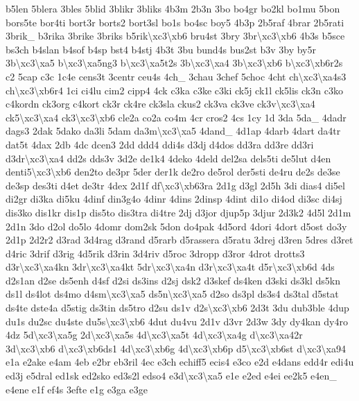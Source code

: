 \begin{DoxyCompactItemize}
b5len 5blera 3bles 5blid 3blikr 3bliks 4b3m 2b3n 3bo bo4gr bo2kl bo1mu 5bon bors5te bor4ti bort3r borts2 bort3sl bo1s bo4sc boy5 4b3p 2b5raf 4brar 2b5rati 3brik\-\_\- b3rika 3brike 3briks b5rik\textbackslash{}xc3\textbackslash{}xb6 bru4st 3bry 3br\textbackslash{}xc3\textbackslash{}xb6 4b3s b5sce bs3ch b4slan b4sof b4sp bst4 b4stj 4b3t 3bu bund4s bus2st b3v 3by by5r 3b\textbackslash{}xc3\textbackslash{}xa5 b\textbackslash{}xc3\textbackslash{}xa5ng3 b\textbackslash{}xc3\textbackslash{}xa5t2s 3b\textbackslash{}xc3\textbackslash{}xa4 3b\textbackslash{}xc3\textbackslash{}xb6 b\textbackslash{}xc3\textbackslash{}xb6r2s c2 5cap c3c 1c4e cens3t 3centr ceu4s 4ch\-\_\- 3chau 3chef 5choc 4cht ch\textbackslash{}xc3\textbackslash{}xa4s3 ch\textbackslash{}xc3\textbackslash{}xb6r4 1ci ci4lu cim2 cipp4 4ck c3ka c3ke c3ki ck5j ck1l ck5lis ck3n c3ko c4kordn ck3org c4kort ck3r ck4re ck3sla ckus2 ck3va ck3ve ck3v\textbackslash{}xc3\textbackslash{}xa4 ck5\textbackslash{}xc3\textbackslash{}xa4 ck3\textbackslash{}xc3\textbackslash{}xb6 cle2a co2a co4m 4cr cros2 4cs 1cy 1d 3da 5da\-\_\- 4dadr dags3 2dak 5dako da3li 5dam da3m\textbackslash{}xc3\textbackslash{}xa5 4dand\-\_\- 4d1ap 4darb 4dart da4tr dat5t 4dax 2db 4dc dcen3 2dd ddd4 ddi4s d3dj d4dos dd3ra dd3re dd3ri d3dr\textbackslash{}xc3\textbackslash{}xa4 dd2s dds3v 3d2e de1k4 4deko 4deld del2sa dels5ti de5lut d4en denti5\textbackslash{}xc3\textbackslash{}xb6 den2to de3pr 5der der1k de2ro de5rol der5sti de4ru de2s de3se de3sp des3ti d4et de3tr 4dex 2d1f df\textbackslash{}xc3\textbackslash{}xb63ra 2d1g d3gl 2d5h 3di dias4 di5el di2gr di3ka di5ku 4dinf din3g4o 4dinr 4dins 2dinsp 4dint di1o di4od di3sc di4sj dis3ko dis1kr dis1p dis5to dis3tra di4tre 2dj d3jor djup5p 3djur 2d3k2 4d5l 2d1m 2d1n 3do d2ol do5lo 4domr dom2sk 5don do4pak 4d5ord 4dori 4dort d5ost do3y 2d1p 2d2r2 d3rad 3d4rag d3rand d5rarb d5rassera d5ratu 3drej d3ren 5dres d3ret d4ric 3drif d3rig 4d5rik d3rin 3d4riv d5roc 3dropp d3ror 4drot drotts3 d3r\textbackslash{}xc3\textbackslash{}xa4kn 3dr\textbackslash{}xc3\textbackslash{}xa4kt 5dr\textbackslash{}xc3\textbackslash{}xa4n d3r\textbackslash{}xc3\textbackslash{}xa4t d5r\textbackslash{}xc3\textbackslash{}xb6d 4ds d2s1an d2se ds5enh d4sf d2si ds3ins d2sj dsk2 d3skef ds4ken d3ski ds3kl ds5kn ds1l ds4lot ds4mo d4sm\textbackslash{}xc3\textbackslash{}xa5 ds5n\textbackslash{}xc3\textbackslash{}xa5 d2so ds3pl ds3s4 ds3tal d5stat ds4te dste4a d5stig ds3tin ds5tro d2su ds1v d2s\textbackslash{}xc3\textbackslash{}xb6 2d3t 3du dub3ble 4dup du1s du2sc du4ste du5s\textbackslash{}xc3\textbackslash{}xb6 4dut du4vu 2d1v d3vr 2d3w 3dy dy4kan dy4ro 4dz 5d\textbackslash{}xc3\textbackslash{}xa5g 2d\textbackslash{}xc3\textbackslash{}xa5s 4d\textbackslash{}xc3\textbackslash{}xa5t 4d\textbackslash{}xc3\textbackslash{}xa4g d\textbackslash{}xc3\textbackslash{}xa42r 3d\textbackslash{}xc3\textbackslash{}xb6 d\textbackslash{}xc3\textbackslash{}xb6ds1 4d\textbackslash{}xc3\textbackslash{}xb6g 4d\textbackslash{}xc3\textbackslash{}xb6p d5\textbackslash{}xc3\textbackslash{}xb6st d\textbackslash{}xc3\textbackslash{}xa94 e1a e2ake e4am 4eb e2br eb3ril 4ec e3ch echiff5 ecis4 e3co e2d e4dans edd4r edi4u ed3j e5dral ed1sk ed2sko ed3s2l edso4 e3d\textbackslash{}xc3\textbackslash{}xa5 e1e e2ed e4ei ee2k5 e4en\-\_\- e4ene e1f ef4s 3efte e1g e3ga e3ge 
\end{DoxyCompactItemize}
